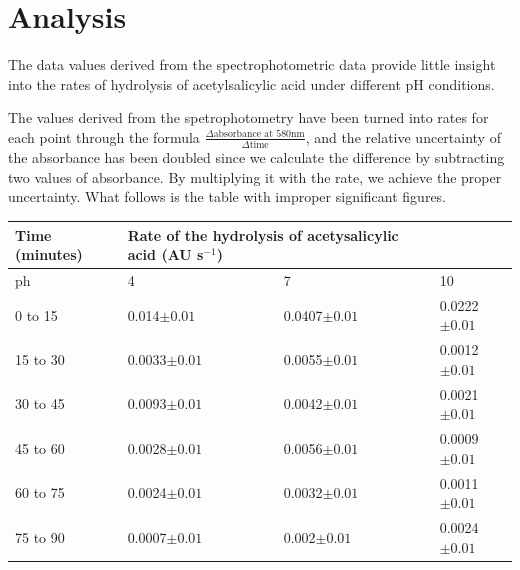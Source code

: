 \documentclass{article}
\begin{document}
\section{Analysis}

The data values derived from the spectrophotometric data provide little insight into the rates of hydrolysis of acetylsalicylic acid under different pH conditions.

The values derived from the spetrophotometry have been turned into rates for each point through the formula $\frac{\Delta \text{absorbance at 580nm}}{\Delta \text{time}}$, and the relative uncertainty of the absorbance has been doubled since we calculate the difference by subtracting two values of absorbance. By multiplying it with the rate, we achieve the proper uncertainty. What follows is the table with improper significant figures.

\begin{table}[H]
    \centering
    \begin{tabular}{|l|l|l|l|}
    \hline
        Time (minutes) & \multicolumn{2}{l}{Rate of the hydrolysis of acetysalicylic acid (AU s$^{-1}$)}& \\ \hline
        ph & 4 \enspace\enspace\enspace\enspace\enspace\enspace\enspace\enspace\enspace\enspace\enspace\enspace\enspace\enspace\enspace\enspace& 7 & 10\enspace\enspace\enspace\enspace\enspace\enspace\enspace\enspace\enspace\enspace\enspace\enspace\enspace\enspace\enspace\enspace \\ \hline
        0 to 15 & 0.014$\pm0.01$ & 0.0407$\pm0.01$ & 0.0222$\pm0.01$ \\ \hline
        15 to 30 & 0.0033$\pm0.01$ & 0.0055$\pm0.01$ & 0.0012$\pm0.01$ \\ \hline
        30 to 45 & 0.0093$\pm0.01$ & 0.0042$\pm0.01$ & 0.0021$\pm0.01$ \\ \hline
        45 to 60 & 0.0028$\pm0.01$ & 0.0056$\pm0.01$ & 0.0009$\pm0.01$ \\ \hline
        60 to 75 & 0.0024$\pm0.01$ & 0.0032$\pm0.01$ & 0.0011$\pm0.01$ \\ \hline
        75 to 90 & 0.0007$\pm0.01$ & 0.002$\pm0.01$ & 0.0024$\pm0.01$ \\ \hline
    \end{tabular}
\end{table}
\end{document}
